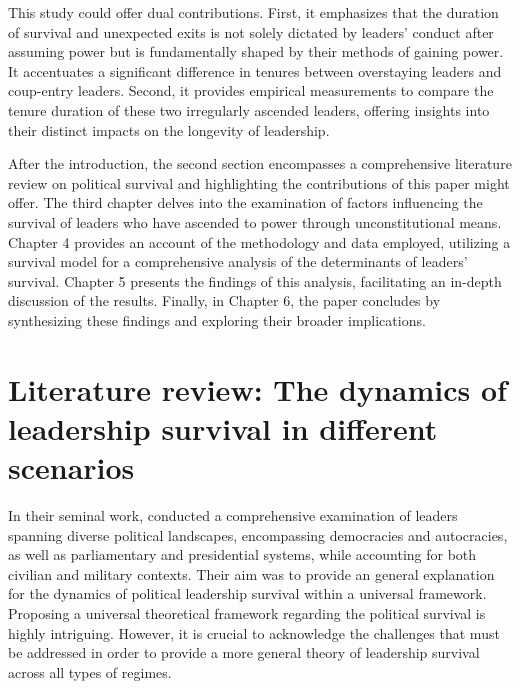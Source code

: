 \documentclass[
  12pt,
  a4paper,
  12pt]{article}
\begin{document}
This study could offer dual contributions. First, it emphasizes that the
duration of survival and unexpected exits is not solely dictated by
leaders' conduct after assuming power but is fundamentally shaped by
their methods of gaining power. It accentuates a significant difference
in tenures between overstaying leaders and coup-entry leaders. Second,
it provides empirical measurements to compare the tenure duration of
these two irregularly ascended leaders, offering insights into their
distinct impacts on the longevity of leadership.

After the introduction, the second section encompasses a comprehensive
literature review on political survival and highlighting the
contributions of this paper might offer. The third chapter delves into
the examination of factors influencing the survival of leaders who have
ascended to power through unconstitutional means. Chapter 4 provides an
account of the methodology and data employed, utilizing a survival model
for a comprehensive analysis of the determinants of leaders' survival.
Chapter 5 presents the findings of this analysis, facilitating an
in-depth discussion of the results. Finally, in Chapter 6, the paper
concludes by synthesizing these findings and exploring their broader
implications.

\hypertarget{literature-review-the-dynamics-of-leadership-survival-in-different-scenarios}{%
\section{Literature review: The dynamics of leadership survival in
different
scenarios}\label{literature-review-the-dynamics-of-leadership-survival-in-different-scenarios}}

In their seminal work, \citet{buenodemesquita2003} conducted a
comprehensive examination of leaders spanning diverse political
landscapes, encompassing democracies and autocracies, as well as
parliamentary and presidential systems, while accounting for both
civilian and military contexts. Their aim was to provide an general
explanation for the dynamics of political leadership survival within a
universal framework. Proposing a universal theoretical framework
regarding the political survival is highly intriguing. However, it is
crucial to acknowledge the challenges that must be addressed in order to
provide a more general theory of leadership survival across all types of
regimes.
\end{document}
